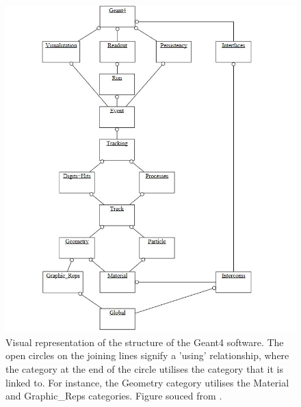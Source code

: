 \begin{figure}[H]
    \centering
    \includegraphics[scale=0.5]{Geant4Structure.jpg}
    \caption{Visual representation of the structure of the Geant4 software. The open circles on the joining lines signify a 'using' relationship, where the category at the end of the circle utilises the category that it is linked to. For instance, the Geometry category utilises the Material and Graphic\_Reps categories. Figure souced from \cite{GEANT4:2002zbu}.}
    \label{Geant4Structure}
\end{figure}
